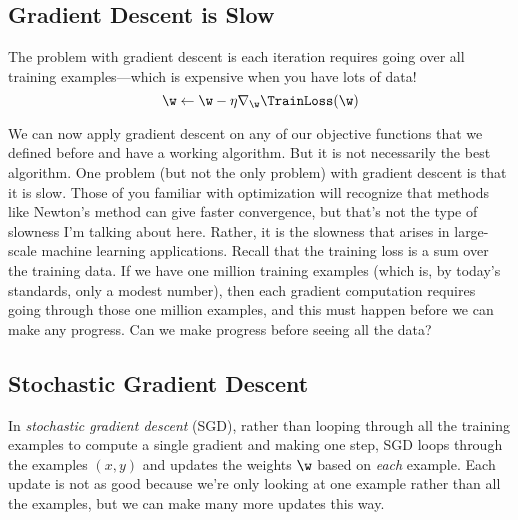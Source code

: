 
\subsection{Gradient Descent is Slow} %
\label{sub:gradient_descent_is_slow}
The problem with gradient descent is each iteration requires going over all training examples---which is expensive when you have lots of data!
\[
  \w \leftarrow \w - \eta \nabla_{\w} \TrainLoss(\w)
\]

We can now apply gradient descent on any of our objective functions that we defined before and have a working algorithm.
But it is not necessarily the best algorithm.
% 
One problem (but not the only problem) with gradient descent is that it is slow.
Those of you familiar with optimization will recognize that methods like Newton's method can give faster convergence,
but that's not the type of slowness I'm talking about here.
% 
Rather, it is the slowness that arises in large-scale machine learning applications.
Recall that the training loss is a sum over the training data.
If we have one million training examples (which is, by today's standards, only a modest number),
then each gradient computation requires going through those one million examples, and this must happen before we can make any progress.
Can we make progress before seeing all the data?



\subsection{Stochastic Gradient Descent} %
\label{sub:stochastic_gradient_descent}

In \textit{stochastic gradient descent} (SGD), %
rather than looping through all the training examples to compute a single gradient and making one step,
SGD loops through the examples $(x,y)$ and updates the weights $\w$ based on \textit{each} example.
Each update is not as good because we're only looking at one example rather than all the examples, but we can make many more updates this way.

